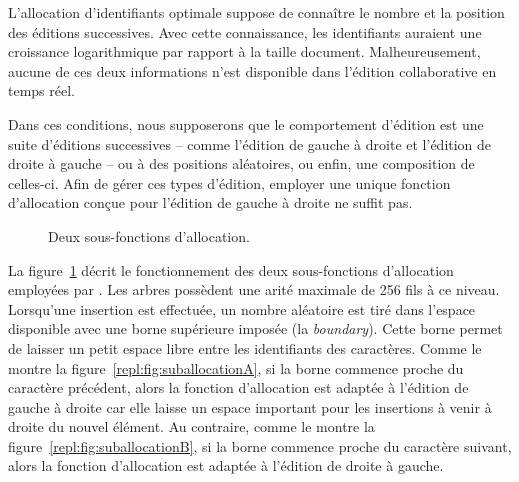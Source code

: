 L'allocation d'identifiants optimale suppose de connaître le nombre et la
position des éditions successives. Avec cette connaissance, les identifiants
auraient une croissance logarithmique par rapport à la taille
document. Malheureusement, aucune de ces deux informations n'est disponible dans
l'édition collaborative en temps réel.

Dans ces conditions, nous supposerons que le comportement d'édition est une
suite d'éditions successives -- comme l'édition de gauche à droite et l'édition
de droite à gauche -- ou à des positions aléatoires, ou enfin, une composition
de celles-ci. Afin de gérer ces types d'édition, employer une unique fonction
d'allocation conçue pour l'édition de gauche à droite ne suffit pas.

\begin{figure}
  \begin{center}
    \hspace{20pt}
    \caption[Deux sous-fonctions d'allocation]
    {\label{repl:fig:suballocation}Deux sous-fonctions d'allocation.}
  \end{center}
\end{figure}

La figure~\ref{repl:fig:suballocation} décrit le fonctionnement des deux
sous-fonctions d'allocation employées par \LSEQ. Les arbres possèdent une arité
maximale de 256 fils à ce niveau. Lorsqu'une insertion est effectuée, un nombre
aléatoire est tiré dans l'espace disponible avec une borne supérieure imposée
(la \emph{boundary}). Cette borne permet de laisser un petit espace libre entre
les identifiants des caractères.
Comme le montre la figure~\ref{repl:fig:suballocationA}, si la borne commence
proche du caractère précédent, alors la fonction d'allocation est adaptée à
l'édition de gauche à droite car elle laisse un espace important pour les
insertions à venir à droite du nouvel élément. Au contraire, comme le montre la
figure~\ref{repl:fig:suballocationB}, si la borne commence proche du caractère
suivant, alors la fonction d'allocation est adaptée à l'édition de droite à
gauche.

